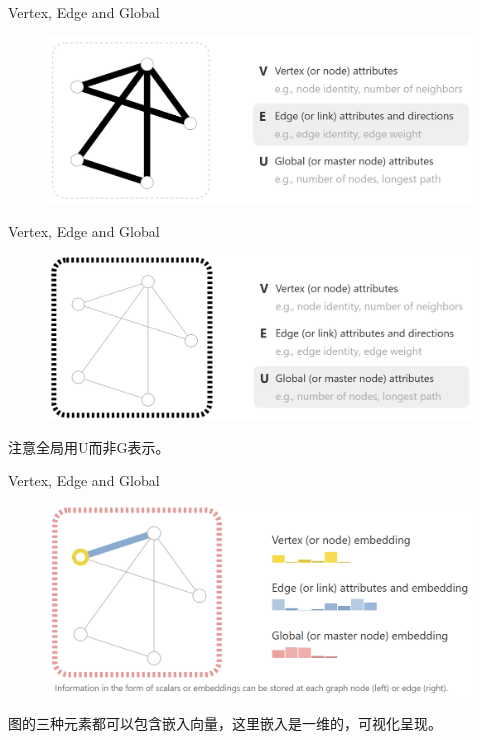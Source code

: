 \documentclass{beamer}
\begin{document}
\begin{frame}{Vertex, Edge and Global}
    \begin{figure}
        \includegraphics[width=\textwidth]{edge.png}
    \end{figure}
\end{frame}

\begin{frame}{Vertex, Edge and Global}
    \begin{figure}
        \includegraphics[width=\textwidth]{global.png}
    \end{figure}
    注意全局用U而非G表示。
\end{frame}

\begin{frame}{Vertex, Edge and Global}
    \begin{figure}
        \includegraphics[width=\textwidth]{graph.png}
    \end{figure}
    图的三种元素都可以包含嵌入向量，这里嵌入是一维的，可视化呈现。
\end{frame}
\end{document}
